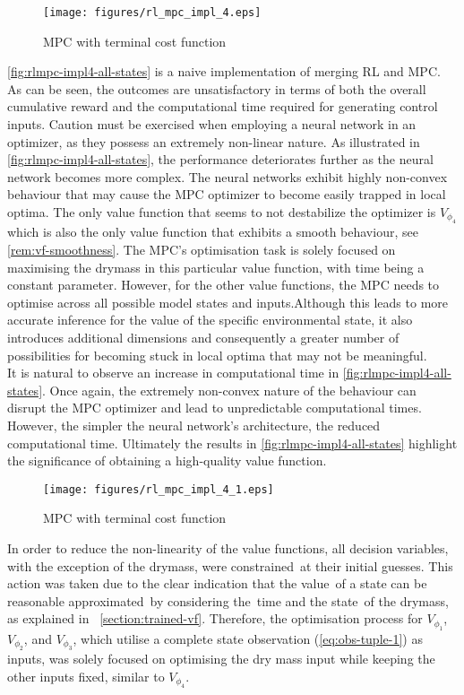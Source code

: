 \begin{figure}[H]
	\centering
	\texttt{[image: figures/rl\_mpc\_impl\_4.eps]}
	\caption{MPC with terminal cost function}
	\label{fig:rlmpc-impl4-all-states}
\end{figure}

\autoref{fig:rlmpc-impl4-all-states} is a naive implementation of merging RL and MPC. As can be seen, the outcomes are unsatisfactory in terms of both the overall cumulative reward and the computational time required for generating control inputs. Caution must be exercised when employing a neural network in an optimizer, as they possess an extremely non-linear nature. As illustrated in \autoref{fig:rlmpc-impl4-all-states}, the performance deteriorates further as the neural network becomes more complex. The neural networks exhibit highly non-convex behaviour that may cause the MPC optimizer to become easily trapped in local optima. The only value function that seems to not destabilize the optimizer is ${V}_{\phi_4}$ which is also the only value function that exhibits a smooth behaviour, see \cref{rem:vf-smoothness}. The MPC's optimisation task is solely focused on maximising the drymass in this particular value function, with time being a constant parameter. However, for the other value functions, the MPC needs to optimise across all possible model states and inputs.Although this leads to more accurate inference for the value of the specific environmental state, it also introduces additional dimensions and consequently a greater number of possibilities for becoming stuck in local optima that may not be meaningful.\\
It is natural to observe an increase in computational time in \autoref{fig:rlmpc-impl4-all-states}. Once again, the extremely non-convex nature of the behaviour can disrupt the MPC optimizer and lead to unpredictable computational times. However, the simpler the neural network's architecture, the reduced computational time. Ultimately the results in \autoref{fig:rlmpc-impl4-all-states} highlight the significance of obtaining a high-quality value function.

\begin{figure}[H]
	\centering
	\texttt{[image: figures/rl\_mpc\_impl\_4\_1.eps]}
	\caption{MPC with terminal cost function}
	\label{fig:rlmpc-impl4-only-drymass}
\end{figure}

In order to reduce the non-linearity of the value functions, all decision variables, with the exception of the drymass, were constrained at their initial guesses. This action was taken due to the clear indication that the value of a state can be reasonable approximated by considering the time and the state of the drymass, as explained in  \autoref{section:trained-vf}. Therefore, the optimisation process for ${V}_{\phi_1}$, ${V}_{\phi_2}$, and ${V}_{\phi_3}$, which utilise a complete state observation (\autoref{eq:obs-tuple-1}) as inputs, was solely focused on optimising the dry mass input while keeping the other inputs fixed, similar to ${V}_{\phi_4}$.

